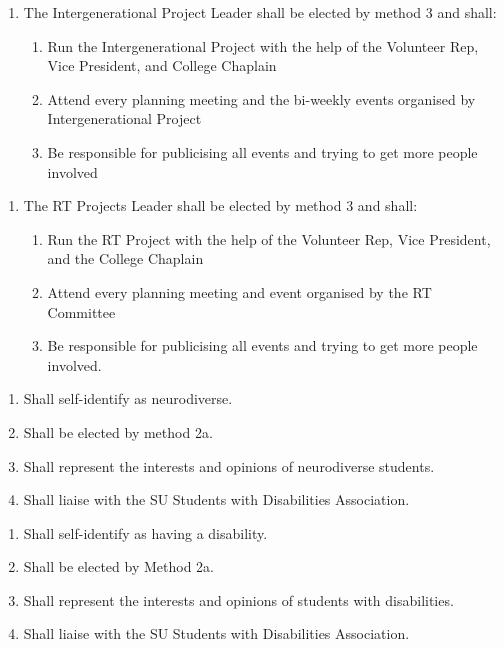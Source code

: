 \begin{enumerate}
    \item The Intergenerational Project Leader shall be elected by method 3 and shall:
    \begin{enumerate}
        \item Run the Intergenerational Project with the help of the Volunteer Rep, Vice President, and College Chaplain
        \item Attend every planning meeting and the bi-weekly events organised by Intergenerational Project
        \item Be responsible for publicising all events and trying to get more people involved
    \end{enumerate}
\end{enumerate}
    
\begin{enumerate}
    \item The RT Projects Leader shall be elected by method 3 and shall:
    \begin{enumerate}
        \item Run the RT Project with the help of the Volunteer Rep, Vice President, and the College Chaplain
        \item Attend every planning meeting and event organised by the RT Committee 
        \item Be responsible for publicising all events and trying to get more people involved.
    \end{enumerate}
\end{enumerate}

\begin{enumerate}
    \item Shall self-identify as neurodiverse.
    \item Shall be elected by method 2a.
    \item Shall represent the interests and opinions of neurodiverse students. 
    \item Shall liaise with the SU Students with Disabilities Association. 
\end{enumerate}

\begin{enumerate}
    \item Shall self-identify as having a disability. 
    \item Shall be elected by Method 2a.
    \item Shall represent the interests and opinions of students with disabilities.
    \item Shall liaise with the SU Students with Disabilities Association.
\end{enumerate}

